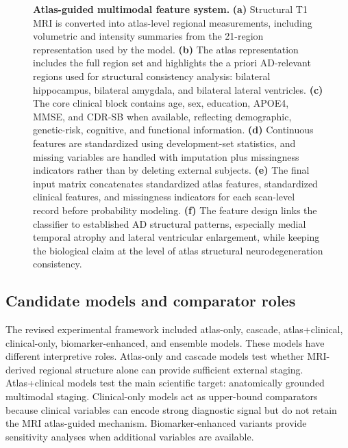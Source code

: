 \begin{figure}[p]
    \centering
    \caption{\textbf{Atlas-guided multimodal feature system.} \textbf{(a)} Structural T1 MRI is converted into atlas-level regional measurements, including volumetric and intensity summaries from the 21-region representation used by the model. \textbf{(b)} The atlas representation includes the full region set and highlights the a priori AD-relevant regions used for structural consistency analysis: bilateral hippocampus, bilateral amygdala, and bilateral lateral ventricles. \textbf{(c)} The core clinical block contains age, sex, education, APOE4, MMSE, and CDR-SB when available, reflecting demographic, genetic-risk, cognitive, and functional information. \textbf{(d)} Continuous features are standardized using development-set statistics, and missing variables are handled with imputation plus missingness indicators rather than by deleting external subjects. \textbf{(e)} The final input matrix concatenates standardized atlas features, standardized clinical features, and missingness indicators for each scan-level record before probability modeling. \textbf{(f)} The feature design links the classifier to established AD structural patterns, especially medial temporal atrophy and lateral ventricular enlargement, while keeping the biological claim at the level of atlas structural neurodegeneration consistency.}
    \label{fig:v6_features}
\end{figure}

\subsection{Candidate models and comparator roles}
\label{sec:candidates}

The revised experimental framework included atlas-only, cascade, atlas+clinical, clinical-only, biomarker-enhanced, and ensemble models. These models have different interpretive roles. Atlas-only and cascade models test whether MRI-derived regional structure alone can provide sufficient external staging. Atlas+clinical models test the main scientific target: anatomically grounded multimodal staging. Clinical-only models act as upper-bound comparators because clinical variables can encode strong diagnostic signal but do not retain the MRI atlas-guided mechanism. Biomarker-enhanced variants provide sensitivity analyses when additional variables are available.

